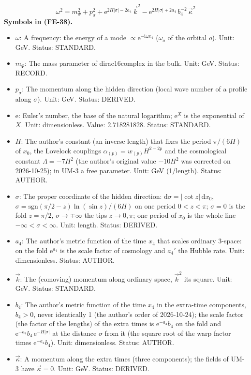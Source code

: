 \documentclass[
  10pt,
]{article}
\providecommand{\tightlist}{%
  \setlength{\itemsep}{0pt}\setlength{\parskip}{0pt}}
\begin{document}
\[
\omega^2 = m_\Psi^2 + p_\sigma^2 + \mathrm{e}^{2H\lvert\sigma\rvert - 2a_4}\,\vec k^2 - \mathrm{e}^{2H\lvert\sigma\rvert + 2a_4}\,b_4^{-2}\,\vec\kappa^2 \tag{FE-38}
\] \textbf{Symbols in (FE-38).}

\begin{itemize}
\tightlist
\item
  \(\omega\): A frequency: the energy of a mode
  \(\propto \mathrm{e}^{-\mathrm{i}\omega x_4}\) (\(\omega_o\) of the
  orbital \(o\)). Unit: GeV. Status: STANDARD.
\item
  \(m_\Psi\): The mass parameter of dirac16complex in the bulk. Unit:
  GeV. Status: RECORD.
\item
  \(p_\sigma\): The momentum along the hidden direction (local wave
  number of a profile along \(\sigma\)). Unit: GeV. Status: DERIVED.
\item
  \(\mathrm{e}\): Euler's number, the base of the natural logarithm;
  \(\mathrm{e}^{X}\) is the exponential of \(X\). Unit: dimensionless.
  Value: 2.718281828. Status: STANDARD.
\item
  \(H\): The author's constant (an inverse length) that fixes the period
  \(\pi/(6H)\) of \(x_0\), the Lovelock couplings
  \(\alpha_{(p)} = w_{(p)}H^{2-2p}\) and the cosmological constant
  \(\Lambda = -7H^2\) (the author's original value \(-10H^2\) was
  corrected on 2026-10-25); in UM-3 a free parameter. Unit: GeV
  (1/length). Status: AUTHOR.
\item
  \(\sigma\): The proper coordinate of the hidden direction:
  \(\mathrm{d}\sigma = \lvert\cot z\rvert\,\mathrm{d}x_0\),
  \(\sigma = \mathrm{sgn}(\pi/2 - z)\ln(\sin z)/(6H)\) on one period
  \(0 < z < \pi\); \(\sigma = 0\) is the fold \(z = \pi/2\),
  \(\sigma \to \mp\infty\) the tips \(z \to 0, \pi\); one period of
  \(x_0\) is the whole line \(-\infty < \sigma < \infty\). Unit: length.
  Status: DERIVED.
\item
  \(a_4\): The author's metric function of the time \(x_4\) that scales
  ordinary 3-space: on the fold \(\mathrm{e}^{a_4}\) is the scale factor
  of cosmology and \(a_4'\) the Hubble rate. Unit: dimensionless.
  Status: AUTHOR.
\item
  \(\vec k\): The (comoving) momentum along ordinary space, \(\vec k^2\)
  its square. Unit: GeV. Status: STANDARD.
\item
  \(b_4\): The author's metric function of the time \(x_4\) in the
  extra-time components, \(b_4 > 0\), never identically 1 (the author's
  order of 2026-10-24); the scale factor (the factor of the lengths) of
  the extra times is \(\mathrm{e}^{-a_4}b_4\) on the fold and
  \(\mathrm{e}^{-a_4}b_4\,\mathrm{e}^{-H\lvert\sigma\rvert}\) at the
  distance \(\sigma\) from it (the square root of the warp factor times
  \(\mathrm{e}^{-a_4}b_4\)). Unit: dimensionless. Status: AUTHOR.
\item
  \(\vec\kappa\): A momentum along the extra times (three components);
  the fields of UM-3 have \(\vec\kappa = 0\). Unit: GeV. Status:
  DERIVED.
\end{itemize}
\end{document}
